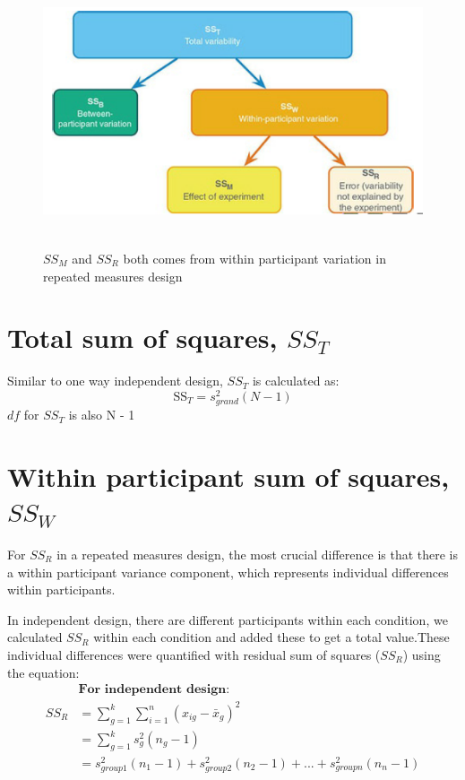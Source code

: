 \makeatletter
\setlength{\@fptop}{0pt} %
\makeatother

\begin{figure}[t!]
	\includegraphics[width=1\textwidth,height=80mm]{Chapter 15 GLM 4 Repeated-measures designs/withinparticipantvariance.PNG}
	\caption{$SS_M$ and $SS_R$ both comes from within participant variation in repeated measures design}
\end{figure}

\section{Total sum of squares, $SS_T$}
Similar to one way independent design, $SS_T$ is calculated as:
\begin{equation}
\text{SS}_T = s^2_{grand}(N-1)
\end{equation}
$df$ for $SS_T$ is also N - 1

\section{Within participant sum of squares,$SS_W$}
For $SS_R$ in a repeated measures design, the most crucial difference is that there is a within participant variance component, which represents individual differences within participants.

 In independent design, there are different participants within each condition, we calculated $SS_R$ within each condition and added these to get a total value.These individual differences were quantified with residual sum of squares ($SS_R$) using the equation:
\begin{equation}
\begin{split}
&\textbf{For independent design}: \\
SS_R& = \sum^k_{g=1} \sum^n_{i=1} (x_{ig}-\bar{x}_g)^2 \\
& = \sum^k_{g=1} s^2_g(n_g - 1)\\
& = s^2_{group1}(n_1 - 1) +  s^2_{group2}(n_2 - 1) + ... +  s^2_{group n}(n_n - 1)
\end{split}
\end{equation}

